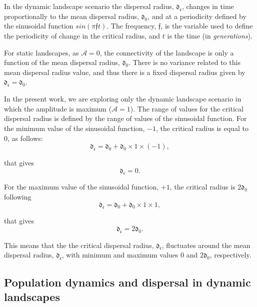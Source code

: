 \documentclass[a4paper,12pt]{article}
\begin{document}
In the dynamic landscape scenario the dispersal radius, $\mathfrak{d_{c}}$, changes in time proportionally to the mean dispersal radius, $\mathfrak{d_{0}}$, and at a periodicity defined by the sinusoidal function $sin(\pi  \mathfrak{f} t)$. The frequency, $\mathfrak{f}$, is the variable used to define the periodicity of change in the critical radius, and $t$ is the time (in \emph{generations}). 

For static landscapes, as $\mathcal{A} = 0$, the connectivity of the landscape is only a function of the mean dispersal radius, $\mathfrak{d_{0}}$. There is no variance related to this mean dispersal radius value, and thus there is a fixed dispersal radius given by $\mathfrak{d_{c}} = \mathfrak{d_{0}}$. 

In the present work, we are exploring only the dynamic landscape scenario in which the amplitude is maximum ($\mathcal{A} = 1$). The range of values for the critical dispersal radius is defined by the range of values of the sinusoidal function. For the minimum value of the sinusoidal function, $-1$, the critical radius is equal to 0, as follows:\\

\begin{equation*}
\mathfrak{d_{c}} = \mathfrak{d_{0}} + \mathfrak{d_{0}} \times 1 \times (-1),
\end{equation*}

that gives 
\begin{equation*}
\mathfrak{d_{c}} = 0.
\end{equation*}

For the maximum value of the sinusoidal function, $+1$, the critical radius is $2\mathfrak{d_{0}}$ following\\
\begin{equation*}
\mathfrak{d_{c}} = \mathfrak{d_{0}} + \mathfrak{d_{0}} \times 1 \times 1,
\end{equation*}

that gives 
\begin{equation*}
\mathfrak{d_{c}} = 2\mathfrak{d_{0}}.
\end{equation*}

This means that the the critical dispersal radius, $\mathfrak{d_{c}}$, fluctuates around the mean dispersal radius, $\mathfrak{d_{c}}$, with minimum and maximum values 0 and $2\mathfrak{d_{0}}$, respectively.\\

\subsection*{Population dynamics and dispersal in dynamic landscapes}
\end{document}
